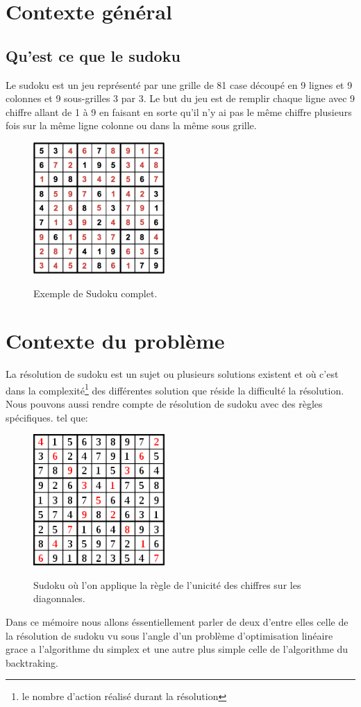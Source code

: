 
\hypertarget{contexte-general}{%
\section{Contexte général}\label{contexte-guxe9nuxe9ral}}
\subsection{Qu'est ce que le sudoku}

Le sudoku est un jeu représenté par une grille de 81 case découpé en 9 lignes et 9 colonnes et 9 sous-grilles 3 par 3.
Le but du jeu est de remplir chaque ligne avec 9 chiffre allant de 1 à 9 en faisant en sorte qu'il n'y ai pas le même chiffre plusieurs fois sur la même ligne colonne ou dans la même sous grille.

\begin{figure}[!h]
\centering
\includegraphics[width=5cm]{./images/Sudoku_Exemple.png}\label{Sudoku}
\caption{Exemple de Sudoku complet.}
\end{figure}

\hypertarget{Contexte du problème}{%
\section{Contexte du problème}\label{Contexte_du_probleme}}

La résolution de sudoku est un sujet ou plusieurs solutions existent et où c'est dans la complexité\footnote{le nombre d'action réalisé durant la résolution} des différentes solution que réside la difficulté la résolution. Nous pouvons aussi rendre compte de résolution de sudoku avec des règles spécifiques.
\newline
tel que:

\begin{figure}[!h]
\centering
\includegraphics[width=5cm]{./images/Sudoku_Special.png}\label{Sudoku_Special}
\caption{Sudoku où l'on applique la règle de l'unicité des chiffres sur les diagonnales.}
\end{figure}

Dans ce mémoire nous allons éssentiellement parler de deux d'entre elles celle de la résolution de sudoku vu sous l'angle d'un problème d'optimisation linéaire grace a l'algorithme du simplex et une autre plus simple celle de l'algorithme du backtraking.
